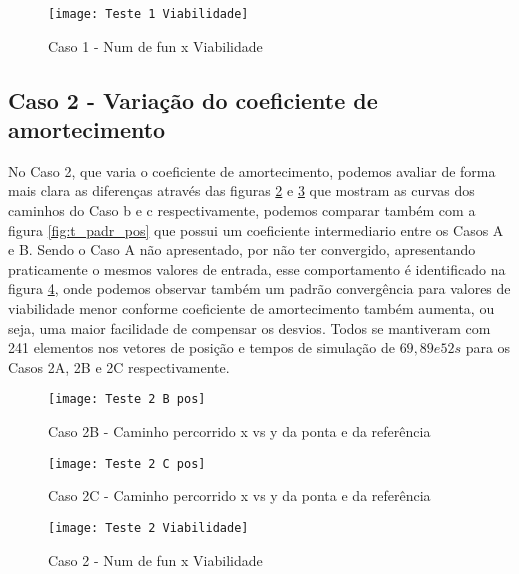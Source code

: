 \begin{figure}[!htb]
    \begin{center}
    \caption{Caso 1 - Num de fun x Viabilidade}
    \texttt{[image: Teste 1 Viabilidade]}
    \label{fig:t_1_viab}
    \end{center}
\end{figure}

\subsection{Caso 2 - Variação do coeficiente de amortecimento}
No Caso 2, que varia o coeficiente de amortecimento, podemos avaliar de forma mais clara as diferenças através das figuras
\ref{fig:t_2b_pos} e \ref{fig:t_2c_pos} que mostram as curvas dos caminhos do Caso b e c respectivamente, podemos comparar também
com a figura \ref{fig:t_padr_pos} que possui um coeficiente intermediario entre os Casos A e B.
Sendo o Caso A não apresentado, por não ter convergido, apresentando praticamente o mesmos valores de entrada, esse comportamento
é identificado na figura \ref{fig:t_2_viab}, onde podemos observar também um padrão convergência para valores de viabilidade menor conforme
coeficiente de amortecimento também aumenta, ou seja, uma maior facilidade de compensar os desvios.
Todos se mantiveram com 241 elementos nos vetores de posição e tempos de simulação de $69, 89 e 52 s$ para os Casos 2A, 2B e 2C respectivamente.

\begin{figure}[!htb]
    \begin{center}
    \caption{Caso 2B - Caminho percorrido x vs y da ponta e da referência}
    \texttt{[image: Teste 2 B pos]}
    \label{fig:t_2b_pos}
    \end{center}
\end{figure}

\begin{figure}[!htb]
    \begin{center}
    \caption{Caso 2C - Caminho percorrido x vs y da ponta e da referência}
    \texttt{[image: Teste 2 C pos]}
    \label{fig:t_2c_pos}
    \end{center}
\end{figure}

\begin{figure}[!htb]
    \begin{center}
    \caption{Caso 2 - Num de fun x Viabilidade}
    \texttt{[image: Teste 2 Viabilidade]}
    \label{fig:t_2_viab}
    \end{center}
\end{figure}

